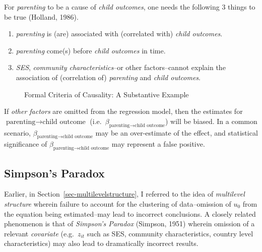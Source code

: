 \documentclass[
  letterpaper,
  DIV=11,
  numbers=noendperiod]{scrreprt}
\providecommand{\tightlist}{%
  \setlength{\itemsep}{0pt}\setlength{\parskip}{0pt}}\usepackage{longtable,booktabs,array}
\begin{document}
For \emph{parenting} to be a cause of \emph{child outcomes}, one needs
the following 3 things to be true (Holland, 1986).

\begin{enumerate}
\def\labelenumi{\arabic{enumi}.}
\tightlist
\item
  \emph{parenting} is (are) associated with (correlated with)
  \emph{child outcomes}.
\item
  \emph{parenting} come(s) before \emph{child outcomes} in time.
\item
  \emph{SES}, \emph{community characteristics}--or other factors--cannot
  explain the association of (correlation of) \emph{parenting} and
  \emph{child outcomes}.
\end{enumerate}

\begin{figure}


\caption{\label{fig-causalitysubstantive}Formal Criteria of Causality: A
Substantive Example}

\end{figure}%

If \emph{other factors} are omitted from the regression model, then the
estimates for \(\text{parenting} \rightarrow \text{child outcome}\)
(i.e.~\(\beta_{\text{parenting} \rightarrow \text{child outcome}}\))
will be biased. In a common scenario,
\(\beta_{\text{parenting} \rightarrow \text{child outcome}}\) may be an
over-estimate of the effect, and statistical significance of
\(\beta_{\text{parenting} \rightarrow \text{child outcome}}\) may
represent a false positive.

\subsection{Simpson's Paradox}\label{simpsons-paradox}

Earlier, in Section~\ref{sec-multilevelstructure}, I referred to the
idea of \emph{multilevel structure} wherein failure to account for the
clustering of data--omission of \(u_0\) from the equation being
estimated--may lead to incorrect conclusions. A closely related
phenomenon is that of \emph{Simpson's Paradox} (Simpson, 1951) wherein
omission of a relevant \emph{covariate} (e.g.~\(z_{it}\) such as SES,
community characteristics, country level characteristics) may also lead
to dramatically incorrect results.
\end{document}
